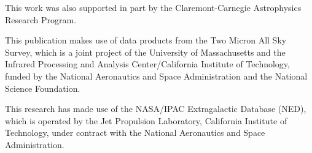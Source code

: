 \documentclass[a4paper,fleqn,usenatbib]{mnras}
\begin{document}
This work was also supported in part by the Claremont-Carnegie Astrophysics Research Program.

This publication makes use of data products from the Two Micron All Sky Survey, which is a joint project of the University of Massachusetts and the Infrared Processing and Analysis Center/California Institute of Technology, funded by the National Aeronautics and Space Administration and the National Science Foundation.

This research has made use of the NASA/IPAC Extragalactic Database (NED), which is operated by the Jet Propulsion Laboratory, California Institute of Technology, under contract with the National Aeronautics and Space Administration.












\clearpage

\newpage

\appendix


\setlength{\tabcolsep}{.5em}
\end{document}

